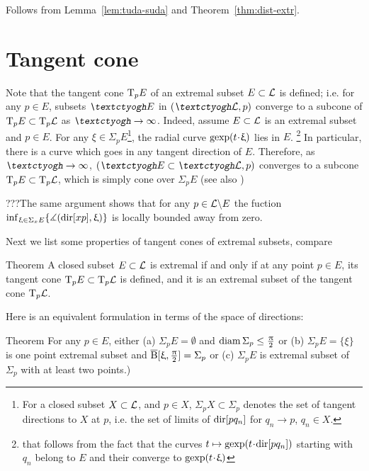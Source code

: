 Follows from Lemma~\ref{lem:tuda-suda} 
and Theorem~\ref{thm:dist-extr}.\qeds

\section{Tangent cone}

Note that the tangent cone \label{T_pE}$\text{\rm T}_p E$ of an extremal subset $E\subset \spc{L}$ is defined; 
i.e.
for any $p\in E$, subsets $\lam E$ in $(\lam \spc{L},p)$ converge to a subcone of $\T_p E\subset \T_p \spc{L}$ as
$\lam\to\infty$.
Indeed, assume $E\subset \spc{L}$ is an extremal subset and $p\in E$.
For any $\xi\in \Sigma_p E$\footnote{\label{U_pX}For a closed subset $X\subset \spc{L}$, and $p\in X$, $\Sigma_p X\subset \Sigma_p$ denotes the set of tangent directions to $X$ at $p$, i.e. the
set of limits of $\mathrm{dir}[{p}{q_n}]$ for $q_n\to p$, $q_n\in X$.}, the radial curve $\gexp(t\cdot\xi)$ lies in $E$.%
\footnote{that follows from the fact that the curves 
$t\mapsto\gexp(t\cdot\dir p{q_n})$ starting with $q_n$ belong to $E$
and their converge to $\gexp(t\cdot\xi)$} 
In particular, there is a curve which goes in any tangent direction of $E$.
Therefore, as $\lam\to\infty$,  $(\lam E\subset \lam \spc{L},p)$ converges to
a subcone $\T_p E\subset \T_p \spc{L}$, which is simply cone over $\Sigma_p E$ (see also
\cite[3.3]{perelman-petrunin:extremal})

???The same argument shows that for any $p\in \spc{L}\backslash E$ the fuction $\inf_{\xi\in\Sigma_xE}\{\mangle(\dir x p,\xi)\}$ is locally bounded away from zero.

Next we list some properties of tangent cones of extremal subsets, compare
\cite[1.4]{perelman-petrunin:extremal}

\begin{thm}{Theorem}
\label{ext-tangent} A closed subset $E\subset \spc{L}$ is  extremal if and only if 
at any point $p\in E$, its tangent cone $\T_p E\subset \T_p \spc{L}$ is defined,
and it is an extremal subset of the tangent cone $\text{\rm T}_p \mathcal{L}$.
\end{thm}

Here is an equivalent formulation in terms of the space of directions: 

\begin{thm}{Theorem}
For any $p\in E$,
either 
(a) $\Sigma_p E=\emptyset$ and $\diam \Sigma_p\le\tfrac\pi2$ or 
(b) $\Sigma_p E=\{\xi\}$ is one point extremal subset and $\overline{\mathrm{B}}{}[\upxi,\tfrac{\uppi}2]=\Sigma_p$
or
(c) $\Sigma_p E$ is extremal subset of $\Sigma_p$ with at least two points.)
\end{thm}


